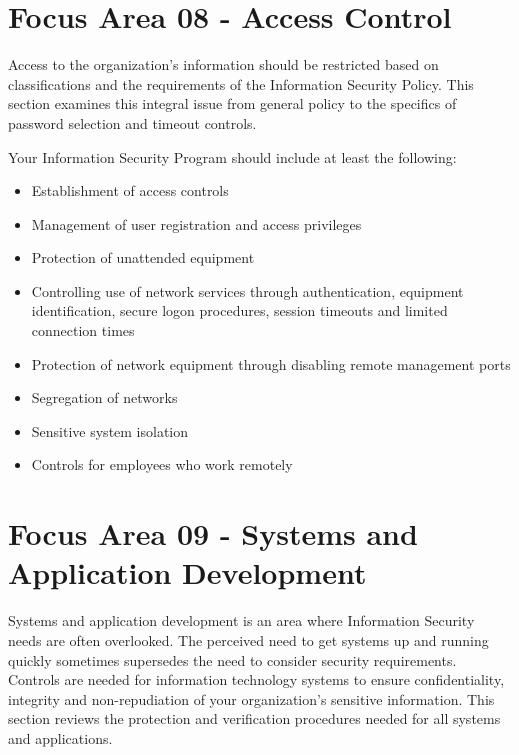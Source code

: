 \documentclass{needs}
\begin{document}
		\vspace{20pt}
		\fSevenTable
	
	\section{Focus Area 08 - Access Control}
	
		Access to the organization’s information should be restricted based on classifications and the requirements of the Information Security Policy.  This section examines this integral issue from general policy to the specifics of password selection and timeout controls.
		
		Your Information Security Program should include at least the following: 
		\begin{itemize}
			\item Establishment of access controls
			\item Management of user registration and access privileges
			\item Protection of unattended equipment
			\item Controlling use of network services through authentication, equipment identification, secure logon procedures, session timeouts and limited connection times
			\item Protection of network equipment through disabling remote management ports
			\item Segregation of networks
			\item Sensitive system isolation
			\item Controls for employees who work remotely
		\end{itemize}		
		
		\vspace{20pt}
		\fEightTable
		
	\section{Focus Area 09 - Systems and Application Development}
	
		Systems and application development is an area where Information Security needs are often overlooked.  The perceived need to get systems up and running quickly sometimes supersedes the need to consider security requirements.  Controls are needed for information technology systems to ensure confidentiality, integrity and non-repudiation of your organization’s sensitive information.  This section reviews the protection and verification procedures needed for all systems and applications.
		
\end{document}
